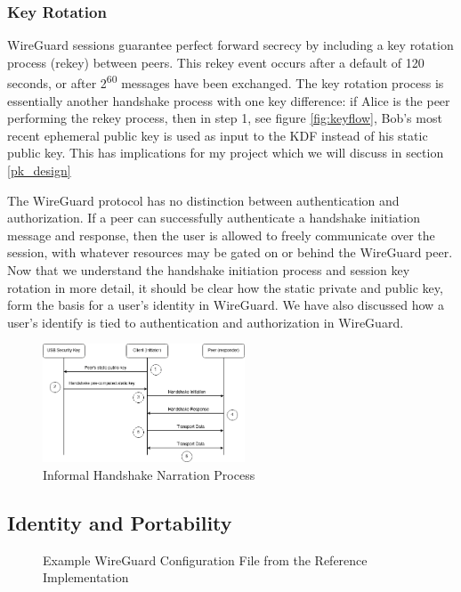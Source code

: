 \documentclass [11pt, proquest] {uwthesis}[2020/02/24]
\begin{document}
\subsubsection{Key Rotation}
\label{keyrotate}
WireGuard sessions guarantee perfect forward secrecy by including a key rotation process (rekey) between peers. This rekey event occurs after a default of 120 seconds, or after 2\textsuperscript{60} messages have been exchanged. The key rotation process is essentially another handshake process with one key difference: if Alice is the peer performing the rekey process, then in step 1, see figure \ref{fig:keyflow}, Bob's most recent ephemeral public key is used as input to the KDF instead of his static public key. This has implications for my project which we will discuss in section \ref{pk_design}

The WireGuard protocol has no distinction between authentication and authorization. If a peer can successfully authenticate a handshake initiation message and response, then the user is allowed to freely communicate over the session, with whatever resources may be gated on or behind the WireGuard peer.
Now that we understand the handshake initiation process and session key rotation in more detail, it should be clear how the static private and public key, form the basis for a user's identity in WireGuard. We have also discussed how a user's identify is tied to authentication and authorization in WireGuard.

\begin{figure}[ht]
\includegraphics[width=6cm]{paper/images/Process_Diagram.drawio.png}
\caption{Informal Handshake Narration Process}
\label{fig:handshake_process}
\end{figure}

\subsection {Identity and Portability}
\label{identity}

\begin{figure}[ht]
\caption{Example WireGuard Configuration File from the Reference Implementation}
\label{fig:wg_config}
\end{figure}
\end{document}
